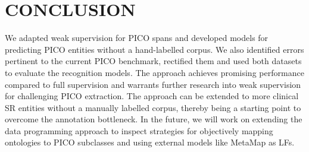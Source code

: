 \documentclass[10.7pt,]{article}
\begin{document}
\section{CONCLUSION}\label{conclusion}
%
We adapted weak supervision for PICO spans and developed models for predicting PICO entities without a hand-labelled corpus.
We also identified errors pertinent to the current PICO benchmark, rectified them and used both datasets to evaluate the recognition models.
The approach achieves promising performance compared to full supervision and warrants further research into weak supervision for challenging PICO extraction.
The approach can be extended to more clinical SR entities without a manually labelled corpus, thereby being a starting point to overcome the annotation bottleneck.
In the future, we will work on extending the data programming approach to inspect strategies for objectively mapping ontologies to PICO subclasses and using external models like MetaMap as LFs.
%
%
%
%
%
%
\end{document}
